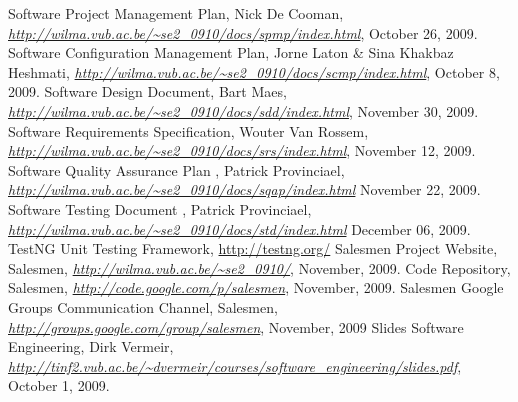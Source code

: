 \documentclass[salesmen, twoside]{../../../templates/latex/2009/softproj}
\begin{document}
\begin{projdoc}
\begin{thebibliography}{99}
Software Project Management Plan, Nick De Cooman, \emph{\url{http://wilma.vub.ac.be/~se2_0910/docs/spmp/index.html}}, October 26, 2009.
Software Configuration Management Plan, Jorne Laton \& Sina Khakbaz Heshmati, \emph{\url{http://wilma.vub.ac.be/~se2_0910/docs/scmp/index.html}}, October 8, 2009.
Software Design Document, Bart Maes, \emph{\url{http://wilma.vub.ac.be/~se2_0910/docs/sdd/index.html}}, November 30, 2009.
Software Requirements Specification, Wouter Van Rossem, \emph{\url{http://wilma.vub.ac.be/~se2_0910/docs/srs/index.html}}, November 12, 2009.
Software Quality Assurance Plan , Patrick Provinciael, \emph{\url{http://wilma.vub.ac.be/~se2_0910/docs/sqap/index.html}} November 22, 2009.
Software Testing Document , Patrick Provinciael, \emph{\url{http://wilma.vub.ac.be/~se2_0910/docs/std/index.html}} December 06, 2009.
TestNG Unit Testing Framework, \url{http://testng.org/}
Salesmen Project Website, Salesmen, \emph{\url{http://wilma.vub.ac.be/~se2_0910/}}, November, 2009.
Code Repository, Salesmen, \emph{\url{http://code.google.com/p/salesmen}}, November, 2009.
Salesmen Google Groups Communication Channel, Salesmen, \emph{\url{http://groups.google.com/group/salesmen}}, November, 2009
Slides Software Engineering, Dirk Vermeir, \emph{\url{http://tinf2.vub.ac.be/~dvermeir/courses/software_engineering/slides.pdf}}, October 1, 2009.
\end{thebibliography}
\end{projdoc}
\end{document}

